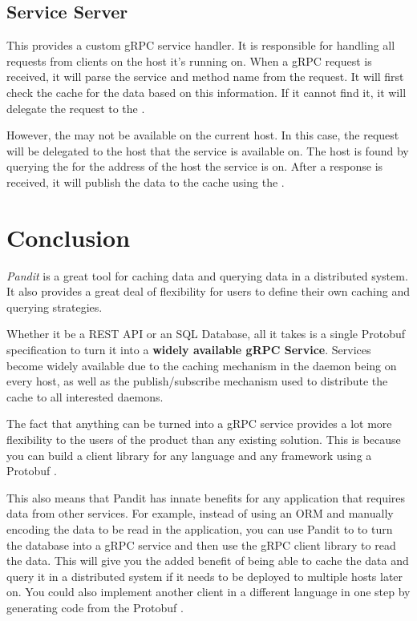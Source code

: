 \documentclass[a4paper]{article}
\begin{document}
\subsection{Service Server}
\label{sec:server}
This provides a custom gRPC service handler. It is responsible for handling all requests from clients on the host it's running on.
When a gRPC request is received, it will parse the service and method name from the request.
It will first check the cache for the data based on this information. If it cannot find it,
it will delegate the request to the \textit{}.

However, the \textit{} may not be available on the current host. In this case, the request will be delegated to the host that the
service is available on. The host is found by querying the \textit{} for the address of the host the service is on.
After a response is received, it will publish the data to the cache using the \textit{}.

\section{Conclusion}
\textit{Pandit} is a great tool for caching data and querying data in a distributed system.
It also provides a great deal of flexibility for users to define their own caching and querying strategies.

Whether it be a REST API or an SQL Database, all it takes is a single Protobuf specification \cite{protobufs} to turn it into a
\textbf{widely available gRPC \cite{grpc} Service}. Services become widely available due to the caching mechanism in the daemon being on every host,
as well as the publish/subscribe mechanism used to distribute the cache to all interested daemons.

The fact that anything can be turned into a gRPC service provides a lot more flexibility to the users of the product than any existing solution.
This is because you can build a client library for any language and any framework using a Protobuf \cite{codegen}.

This also means that Pandit has innate benefits for any application that requires data from other services.
For example, instead of using an ORM \cite{orm} and manually encoding the data to be read in the application, you can use Pandit to
to turn the database into a gRPC service and then use the gRPC client library to read the data. This will give you the added benefit of
being able to cache the data and query it in a distributed system if it needs to be deployed to multiple hosts later on.
You could also implement another client in a different language in one step by generating code from the Protobuf \cite{codegen}.
\end{document}
